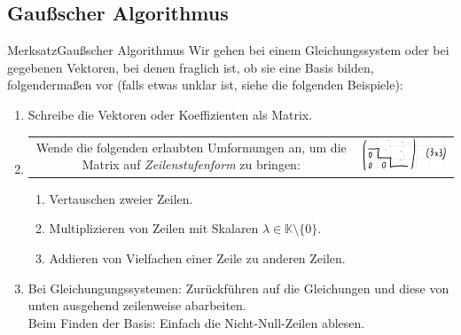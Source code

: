 \subsection{Gaußscher Algorithmus}
\begin{Satz}
{Merksatz}{Gaußscher Algorithmus}
Wir gehen bei einem Gleichungssystem oder bei gegebenen Vektoren, bei denen fraglich ist, ob sie eine Basis bilden, folgendermaßen vor (falls etwas unklar ist, siehe die folgenden Beispiele):
\begin{enumerate}
    \item Schreibe die Vektoren oder Koeffizienten als Matrix.
    \item
\begin{tabular}{c l}
\parbox[b]{9.5cm}{
Wende die folgenden erlaubten Umformungen an, um die Matrix auf \textit{Zeilenstufenform} zu bringen:
} & \includegraphics[width=.25\textwidth]{Dateien/00/11Zeilenstufenform.PNG}
\end{tabular} 
    \begin{enumerate}
        \item Vertauschen zweier Zeilen.
        \item Multiplizieren von Zeilen mit Skalaren $\lambda\in\mathbb{K}\setminus\{0\}$.
        \item Addieren von Vielfachen einer Zeile zu anderen Zeilen.
    \end{enumerate}
    \item Bei Gleichungungssystemen: Zurückführen auf die Gleichungen und diese von unten ausgehend zeilenweise abarbeiten.\\
    Beim Finden der Basis: Einfach die Nicht-Null-Zeilen ablesen.
\end{enumerate}
\end{Satz}
